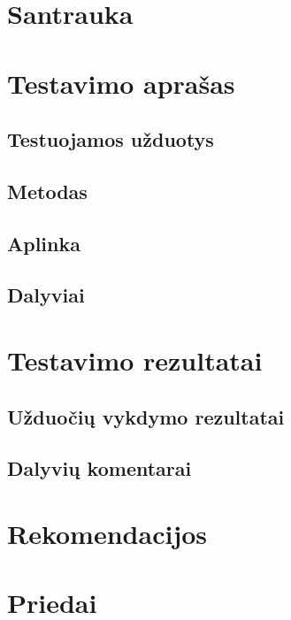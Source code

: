 \section{Santrauka}

	

\section{Testavimo aprašas}

	\subsection{Testuojamos užduotys}
	
	
	
	\subsection{Metodas}
	
	
	
	\subsection{Aplinka}
	
	
	
	\subsection{Dalyviai}
	
	

\section{Testavimo rezultatai}

	\subsection{Užduočių vykdymo rezultatai}
	
	\subsection{Dalyvių komentarai}

\section{Rekomendacijos}

	

\section{Priedai}

